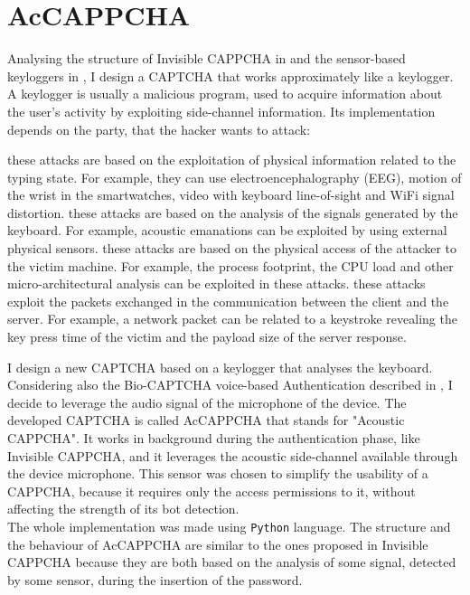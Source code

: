 \chapter{AcCAPPCHA}\label{chapter:AcCAPPCHA}
Analysing the structure of Invisible CAPPCHA in  and the sensor-based keyloggers in , I design a CAPTCHA that works approximately like a keylogger. A keylogger is usually a malicious program, used to acquire information about the user's activity by exploiting side-channel information. Its implementation depends on the party, that the hacker wants to attack\cite{keylogging}:
\begin{itemize}
{these attacks are based on the exploitation of physical information related to the typing state. For example, they can use electroencephalography (EEG), motion of the wrist in the smartwatches, video with keyboard line-of-sight and WiFi signal distortion.}
{these attacks are based on the analysis of the signals generated by the keyboard. For example, acoustic emanations can be exploited by using external physical sensors.}
{these attacks are based on the physical access of the attacker to the victim machine. For example, the process footprint, the CPU load and other micro-architectural analysis can be exploited in these attacks.}
{these attacks exploit the packets exchanged in the communication between the client and the server. For example, a network packet can be related to a keystroke revealing the key press time of the victim and the payload size of the server response.}
\end{itemize}
I design a new CAPTCHA based on a keylogger that analyses the keyboard. Considering also the Bio-CAPTCHA voice-based Authentication described in , I decide to leverage the audio signal of the microphone of the device. The developed CAPTCHA is called AcCAPPCHA that stands for "Acoustic CAPPCHA". It works in background during the authentication phase, like Invisible CAPPCHA, and it leverages the acoustic side-channel available through the device microphone.
This sensor was chosen to simplify the usability of a CAPPCHA, because it requires only the access permissions to it, without affecting the strength of its bot detection.\\
The whole implementation was made using \texttt{Python} language. The structure and the behaviour of AcCAPPCHA are similar to the ones proposed in Invisible CAPPCHA because they are both based on the analysis of some signal, detected by some sensor, during the insertion of the password.\\
